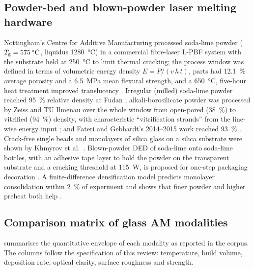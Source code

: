 \subsection{Powder-bed and blown-powder laser melting hardware}
Nottingham's Centre for Additive Manufacturing processed soda-lime powder (\(T_{\mathrm{g}} = \SI{575}{\celsius}\), liquidus \SI{1280}{\celsius}) in a commercial fibre-laser L-PBF system with the substrate held at \SI{250}{\celsius} to limit thermal cracking; the process window was defined in terms of volumetric energy density \(E = P/(v\,h\,t)\), parts had \SI{12.1}{\percent} average porosity and a \SI{6.5}{MPa} mean flexural strength, and a \SI{650}{\celsius}, five-hour heat treatment improved translucency \citep{datsiou2019,datsiou2021}. Irregular (milled) soda-lime powder reached \SI{95}{\percent} relative density at Fudan \citep{slmirregular2023}; alkali-borosilicate powder was processed by Zeiss and TU Ilmenau over the whole window from open-pored (\SI{38}{\percent}) to vitrified (\SI{94}{\percent}) density, with characteristic ``vitrification strands'' from the line-wise energy input \citep{boro2025laser}; and Fateri and Gebhardt's 2014--2015 work reached \SI{93}{\percent} \citep{fateri2015}. Crack-free single beads and monolayers of silica glass on a silica substrate were shown by Khmyrov et al.\ \citep{khmyrov2016}. Blown-powder DED of soda-lime onto soda-lime bottles, with an adhesive tape layer to hold the powder on the transparent substrate and a cracking threshold at \SI{115}{W}, is proposed for one-step packaging decoration \citep{spirrett2023}. A finite-difference densification model predicts monolayer consolidation within \SI{2}{\percent} of experiment and shows that finer powder and higher preheat both help \citep{slmsim2024}.

\subsection{Comparison matrix of glass AM modalities}
 summarises the quantitative envelope of each modality as reported in the corpus. The columns follow the specification of this review: temperature, build volume, deposition rate, optical clarity, surface roughness and strength.

